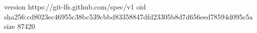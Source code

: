 version https://git-lfs.github.com/spec/v1
oid sha256:cd8023ec46955c38bc539cbbd83358847dfd23305b8d7d656eed78594d095c5a
size 87420
